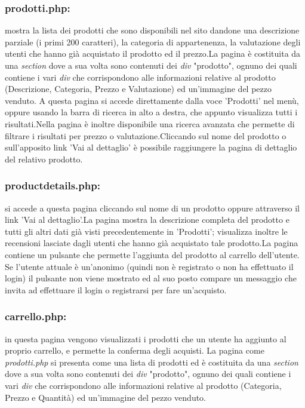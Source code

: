 \subsubsection{prodotti.php:} \Spazio mostra la lista dei prodotti che sono disponibili nel sito dandone una descrizione parziale (i primi 200 caratteri), la categoria di appartenenza, la valutazione degli utenti che hanno già acquistato il prodotto ed il prezzo.\newline La pagina è costituita da una \emph{section} dove a sua volta sono contenuti dei \emph{div} "prodotto", ognuno dei quali contiene i vari \emph{div} che corrispondono alle informazioni relative al prodotto (Descrizione, Categoria, Prezzo e Valutazione) ed un'immagine del pezzo venduto. A questa pagina si accede direttamente dalla voce 'Prodotti' nel menù, oppure usando la barra di ricerca in alto a destra, che appunto visualizza tutti i risultati.\newline Nella pagina è inoltre disponibile una ricerca avanzata che permette di filtrare i risultati per prezzo o valutazione.\newline Cliccando sul nome del prodotto o sull'apposito link 'Vai al dettaglio' è possibile raggiungere la pagina di dettaglio del relativo prodotto.

\subsubsection{productdetails.php:} \Spazio si accede a questa pagina cliccando sul nome di un prodotto oppure attraverso il link 'Vai al dettaglio'.\newline La pagina mostra la descrizione completa del prodotto e tutti gli altri dati già visti precedentemente in 'Prodotti'; visualizza inoltre le recensioni lasciate dagli utenti che hanno già acquistato tale prodotto.\newline La pagina contiene un pulsante che permette l'aggiunta del prodotto al carrello dell'utente. Se l'utente attuale è un'anonimo (quindi non è registrato o non ha effettuato il login) il pulsante non viene mostrato ed al suo posto compare un messaggio che invita ad effettuare il login o registrarsi per fare un'acquisto. 

\subsubsection{carrello.php:} \Spazio in questa pagina vengono visualizzati i prodotti che un utente ha aggiunto al proprio carrello, e permette la conferma degli acquisti. La pagina come \emph{prodotti.php} si presenta come una lista di prodotti ed è costituita da una \emph{section} dove a sua volta sono contenuti dei \emph{div} "prodotto", ognuno dei quali contiene i vari \emph{div} che corrispondono alle informazioni relative al prodotto (Categoria, Prezzo e Quantità) ed un'immagine del pezzo venduto.

